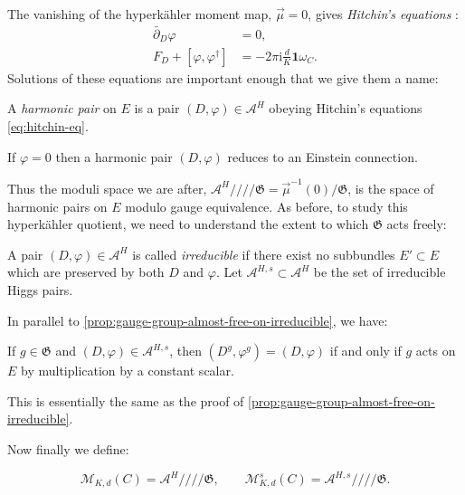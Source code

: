 \documentclass[12pt,letterpaper,reqno]{article}
\numberwithin{equation}{section}
\newcommand{\fG}{{\mathfrak G}}
\newcommand{\cM}{\ensuremath{\mathcal M}}
\newcommand{\cA}{\ensuremath{\mathcal A}}
\newcommand{\hk}{hyperk\"ahler\xspace}
\newcommand{\hkq}{/\!\!/\!\!/\!\!/}
\newcommand{\I}{{\mathrm i}}
\newcommand\bid{{\mathbf 1}}
\newcommand{\ti}[1]{\textit{#1}}
\begin{document}
The vanishing of the \hk moment map, $\vec\mu = 0$, gives \ti{Hitchin's equations} \cite{MR89a:32021}:
\begin{subequations} \label{eq:hitchin-eq}
\begin{align} 
\bar\partial_D \varphi &= 0, \\
F_D + [\varphi,\varphi^\dagger] &= -2 \pi \I \frac{d}{K} \bid \omega_C.
\end{align}
\end{subequations}
Solutions of these equations are important enough that we give them a name:
\begin{defn}
A \ti{harmonic pair} on $E$ is a pair $(D,\varphi) \in \cA^H$ 
obeying Hitchin's equations \eqref{eq:hitchin-eq}.
\end{defn}

If $\varphi = 0$ then a harmonic pair $(D,\varphi)$ reduces to an 
Einstein connection.

Thus the moduli space we are after, $\cA^H \hkq \fG = \vec\mu^{-1}(0) / \fG$,
is the space of harmonic pairs on $E$ modulo gauge equivalence.
As before, to study this \hk quotient,
we need to understand the extent to which
$\fG$ acts freely:

\begin{defn} A pair $(D,\varphi) \in \cA^H$
is called \ti{irreducible} if there exist no subbundles $E' \subset E$
which are preserved by both $D$ and $\varphi$. Let $\cA^{H,s} \subset \cA^H$
be the set of irreducible Higgs pairs.
\end{defn}

In parallel to \autoref{prop:gauge-group-almost-free-on-irreducible},
we have:
\begin{prop}
If $g \in \fG$ and $(D,\varphi) \in \cA^{H,s}$, then
$(D^g,\varphi^g) = (D,\varphi)$
if and only if $g$ acts on $E$ by multiplication by a constant scalar.
\end{prop}
\begin{pf} This is essentially the same as the proof of
\autoref{prop:gauge-group-almost-free-on-irreducible}.
\end{pf}

Now finally we define:
\begin{defn}
\begin{equation}
  \cM_{K,d}(C) = \cA^H \hkq \fG, \qquad \cM^s_{K,d}(C) = \cA^{H,s} \hkq \fG.
\end{equation}
\end{defn}
\end{document}

